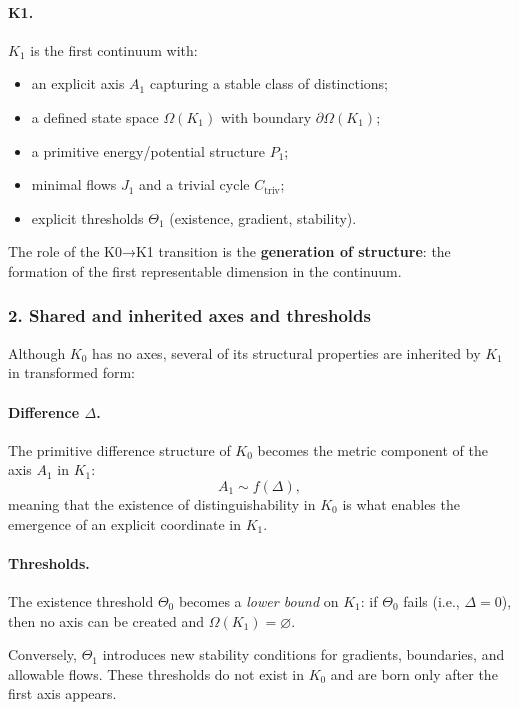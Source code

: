 \paragraph{K1.}
$K_1$ is the first continuum with:
\begin{itemize}
  \item an explicit axis $A_1$ capturing a stable class of distinctions;
  \item a defined state space $\Omega(K_1)$ with boundary $\partial\Omega(K_1)$;
  \item a primitive energy/potential structure $P_1$;
  \item minimal flows $J_1$ and a trivial cycle $C_{\mathrm{triv}}$;
  \item explicit thresholds $\Theta_1$ (existence, gradient, stability).
\end{itemize}

The role of the K0→K1 transition is the \textbf{generation of structure}:
the formation of the first representable dimension in the continuum.

\subsubsection{2. Shared and inherited axes and thresholds}

Although $K_0$ has no axes, several of its structural properties are inherited
by $K_1$ in transformed form:

\paragraph{Difference \texorpdfstring{$\Delta$}{\Delta}.}
The primitive difference structure of $K_0$ becomes the metric component of
the axis $A_1$ in $K_1$:
\[
A_1 \sim f(\Delta),
\]
meaning that the existence of distinguishability in $K_0$ is what enables
the emergence of an explicit coordinate in $K_1$.

\paragraph{Thresholds.}
The existence threshold $\Theta_0$ becomes a \emph{lower bound} on $K_1$:
if $\Theta_0$ fails (i.e., $\Delta=0$), then no axis can be created and
$\Omega(K_1)=\varnothing$.

Conversely, $\Theta_1$ introduces new stability conditions for gradients,
boundaries, and allowable flows. These thresholds do not exist in $K_0$ and
are born only after the first axis appears.


